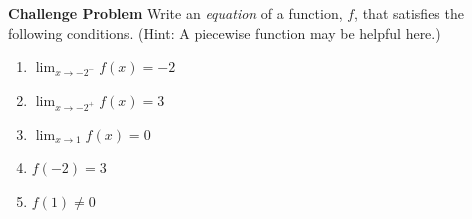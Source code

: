 \documentclass{ximera}
\begin{document}
\begin{exercise}
    \textbf{Challenge Problem} Write an \textit{equation} of a function, $f$, that satisfies the following conditions.  (Hint: A piecewise function may be helpful here.)
    \begin{enumerate}
        \item $\displaystyle\lim_{x\rightarrow -2^-}f(x)=-2$
        \item $\displaystyle \lim_{x\rightarrow -2^+}f(x)=3$
        \item $\displaystyle \lim_{x\rightarrow 1}f(x)=0$
        \item $f(-2)=3$
        \item $f(1)\neq 0$
    \end{enumerate}
\end{exercise}
\end{document}
